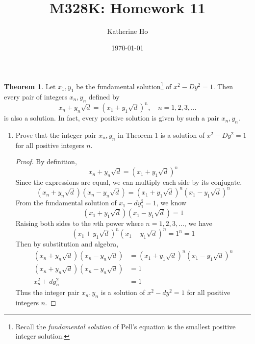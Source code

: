 \documentclass[11pt]{article}
\title{M328K: Homework 11}
\author{Katherine Ho}
\date\today
\theoremstyle{definition}
\newtheorem{thm}{Theorem}
\begin{document}
\maketitle

\begin{thm}
    Let $x_1,y_1$ be the fundamental solution\footnote{Recall the \emph{fundamental solution} of Pell's equation is the smallest positive integer solution.} of $x^2-D y^2 = 1$. Then every pair of integers $x_n, y_n$ defined by
        $$ x_n + y_n \sqrt{d} = (x_1 + y_1 \sqrt{d})^n, \quad n=1,2,3,\dots$$ is also a solution. In fact, every positive solution is given by such a pair $x_n, y_n$.
\end{thm}

\begin{enumerate}
    \item Prove that the integer pair $x_n, y_n$ in Theorem 1 is a solution of $x^2-D y^2 = 1$ for all positive integers $n$. 
    \begin{proof}
        By definition, 
        \[
            x_n + y_n\sqrt{d} = (x_1 + y_1\sqrt{d})^n
        \]
        Since the expressions are equal, we can multiply each side by its conjugate.
        \[
            (x_n + y_n\sqrt{d})(x_n - y_n\sqrt{d}) = (x_1 + y_1\sqrt{d})^n (x_1 - y_1\sqrt{d})^n 
        \]
        From the fundamental solution of $x_1-dy_1^2 = 1$, we know 
        \[
            (x_1 + y_1\sqrt{d}) (x_1 - y_1\sqrt{d}) = 1
        \]
        Raising both sides to the $n$th power where $n = 1, 2, 3, \dots$, we have
        \[
            (x_1 + y_1\sqrt{d})^n (x_1 - y_1\sqrt{d})^n = 1^n = 1
        \]
        Then by substitution and algebra, 
        \begin{align*}
            (x_n + y_n\sqrt{d})(x_n - y_n\sqrt{d}) &= (x_1 + y_1\sqrt{d})^n (x_1 - y_1\sqrt{d})^n \\
            (x_n + y_n\sqrt{d})(x_n - y_n\sqrt{d}) &= 1 \\
            x_n^2 + dy_n^2 &= 1
        \end{align*}
        Thus the integer pair $x_n, y_n$ is a solution of $x^2 - dy^2 = 1$ for all positive integers $n$. 
    \end{proof}
    

\end{enumerate}
\end{document}
